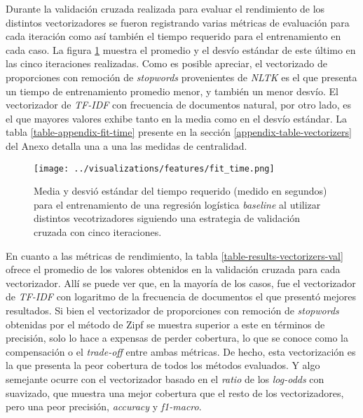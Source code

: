 Durante la validaci\'on cruzada realizada para evaluar el rendimiento de los
distintos vectorizadores se fueron registrando varias m\'etricas de evaluaci\'on
para cada iteraci\'on como as\'i tambi\'en el tiempo requerido para el entrenamiento
en cada caso. La figura \ref{fig-results-features-fit-time} muestra el promedio y el desv\'io
est\'andar de este \'ultimo en las cinco iteraciones realizadas. Como es posible
apreciar, el vectorizado de proporciones con remoci\'on de \textit{stopwords}
provenientes de \textit{NLTK} es el que presenta un tiempo de entrenamiento promedio
menor, y tambi\'en un menor desv\'io. El vectorizador de \textit{TF-IDF} con
frecuencia de documentos natural, por otro lado, es el que mayores valores
exhibe tanto en la media como en el desv\'io est\'andar. La tabla \ref{table-appendix-fit-time}
presente en la secci\'on \ref{appendix-table-vectorizers} del Anexo detalla una
a una las medidas de centralidad.

\begin{figure}[h!]
    \centering
    \texttt{[image: ../visualizations/features/fit\_time.png]}
    \caption{Media y desvi\'o est\'andar del tiempo requerido (medido en segundos)
    para el entrenamiento de una regresi\'on log\'istica \textit{baseline}
    al utilizar distintos vecotrizadores siguiendo una estrategia de
    validaci\'on cruzada con cinco iteraciones.}
    \label{fig-results-features-fit-time}
\end{figure}

En cuanto a las m\'etricas de rendimiento,
la tabla \ref{table-results-vectorizers-val} ofrece el promedio de los valores
obtenidos en la validaci\'on cruzada para cada vectorizador. All\'i se puede ver que,
en la mayor\'ia de los casos, fue el vectorizador de \textit{TF-IDF} con logaritmo
de la frecuencia de documentos el que present\'o mejores resultados. Si bien el
vectorizador de proporciones con remoci\'on de \textit{stopwords} obtenidas por el
m\'etodo de Zipf se muestra superior a este en t\'erminos de precisi\'on, solo
lo hace a expensas de perder cobertura, lo que se conoce como la compensaci\'on o el
\textit{trade-off} entre ambas m\'etricas. De hecho, esta vectorizaci\'on es la que
presenta la peor cobertura de todos los m\'etodos evaluados. Y algo semejante ocurre
con el vectorizador basado en el \textit{ratio} de los \textit{log-odds} con
suavizado, que
muestra una mejor cobertura que el resto de los vectorizadores, pero una peor
precisi\'on, \textit{accuracy} y \textit{f1-macro}.

